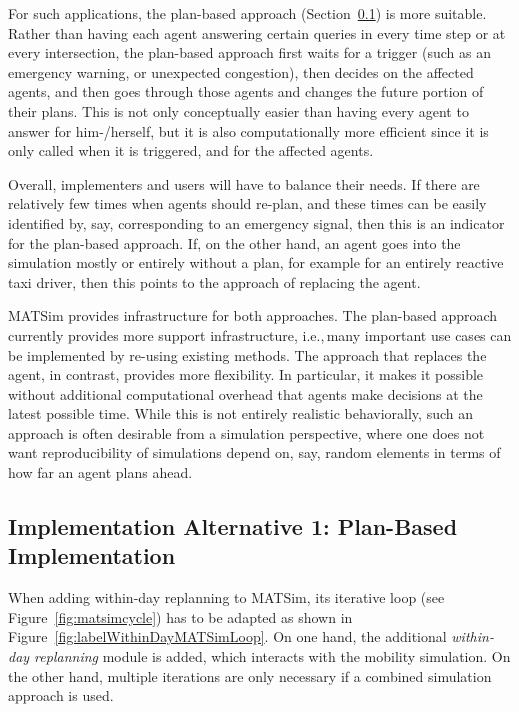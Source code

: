 For such applications, the plan-based approach (Section~\ref{sec:impl-plan-based}) is more suitable.  Rather than having each agent answering certain queries in every time step or at every intersection, the plan-based approach first waits for a trigger (such as an emergency warning, or unexpected congestion), then decides on the affected agents, and then goes through those agents and changes the future portion of their plans. This is not only conceptually easier than having every agent to answer for him-/herself, but it is also computationally more efficient since it is only called when it is triggered, and for the affected agents. 

Overall, implementers and users will have to balance their needs.  
%
If there are relatively few times when agents should re-plan, and these times can be easily identified by, say, corresponding to an emergency signal, then this is an indicator for the plan-based approach.  
%
If, on the other hand, an agent goes into the simulation mostly or entirely without a plan, for example for an entirely reactive taxi driver, then this points to the approach of replacing the agent.

MATSim provides infrastructure for both approaches. The plan-based approach currently provides more support infrastructure, i.e.,\,many important use cases can be implemented by re-using existing methods.  The approach that replaces the agent, in contrast, provides more flexibility.  In particular, it makes it possible without additional computational overhead that agents make decisions at the latest possible time.  While this is not entirely realistic behaviorally, such an approach is often desirable from a simulation perspective, where one does not want reproducibility of simulations depend on, say, random elements in terms of how far an agent plans ahead.

\subsection{Implementation Alternative 1: Plan-Based Implementation}
\label{sec:impl-plan-based}


When adding within-day replanning to MATSim, its iterative loop (see Figure~\ref{fig:matsimcycle}) has to be adapted as shown in Figure~\ref{fig:labelWithinDayMATSimLoop}. On one hand, the additional \emph{within-day replanning} module is added, which interacts with the mobility simulation. On the other hand, multiple iterations are only necessary if a combined simulation approach is used.

